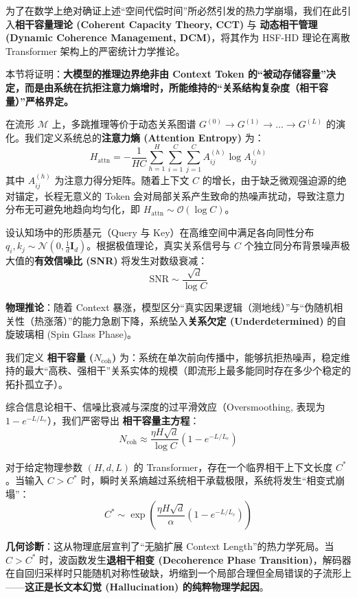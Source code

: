 为了在数学上绝对确证上述“空间代偿时间”所必然引发的热力学崩塌，我们在此引入\textbf{相干容量理论 (Coherent Capacity Theory, CCT)} 与 \textbf{动态相干管理 (Dynamic Coherence Management, DCM)}，将其作为 HSF-HD 理论在离散 Transformer 架构上的严密统计力学推论。

本节将证明：\textbf{大模型的推理边界绝非由 Context Token 的“被动存储容量”决定，而是由系统在抗拒注意力熵增时，所能维持的“关系结构复杂度（相干容量）”严格界定。}


在流形 $\mathcal{M}$ 上，多跳推理等价于动态关系图谱 $G^{(0)} \to G^{(1)} \to \dots \to G^{(L)}$ 的演化。我们定义系统总的\textbf{注意力熵 (Attention Entropy)} 为：
\begin{equation}
    H_{\text{attn}} = - \frac{1}{HC} \sum_{h=1}^H \sum_{i=1}^C \sum_{j=1}^C A_{ij}^{(h)} \log A_{ij}^{(h)}
\end{equation}
其中 $A_{ij}^{(h)}$ 为注意力得分矩阵。随着上下文 $C$ 的增长，由于缺乏微观强迫源的绝对锚定，长程无意义的 Token 会对局部关系产生致命的热噪声扰动，导致注意力分布无可避免地趋向均匀化，即 $H_{\text{attn}} \sim \mathcal{O}(\log C)$。

\begin{theorem}[极值信噪比衰减定理]
    设认知场中的形质基元（Query 与 Key）在高维空间中满足各向同性分布 $q_i, k_j \sim \mathcal{N}(0, \frac{1}{d}\mathbf{I}_d)$。根据极值理论，真实关系信号与 $C$ 个独立同分布背景噪声极大值的\textbf{有效信噪比 (SNR)} 将发生对数级衰减：
    $$ \text{SNR} \sim \frac{\sqrt{d}}{\log C} $$
\end{theorem}
\textbf{物理推论}：随着 Context 暴涨，模型区分“真实因果逻辑（测地线）”与“伪随机相关性（热涨落）”的能力急剧下降，系统坠入\textbf{关系欠定 (Underdetermined)} 的自旋玻璃相 (Spin Glass Phase)。


我们定义 \textbf{相干容量 ($N_{\text{coh}}$)} 为：系统在单次前向传播中，能够抗拒热噪声，稳定维持的最大“高秩、强相干”关系实体的规模（即流形上最多能同时存在多少个稳定的拓扑孤立子）。

综合信息论相干、信噪比衰减与深度的过平滑效应（Oversmoothing, 表现为 $1 - e^{-L/L_c}$），我们严密导出 \textbf{相干容量主方程}：
\begin{equation}
    \boxed{ N_{\text{coh}} \approx \frac{\eta H \sqrt{d}}{\log C} \left(1 - e^{-L/L_c}\right) }
\end{equation}

\begin{corollary}[长上下文相干退化定理]
    对于给定物理参数 $(H, d, L)$ 的 Transformer，存在一个临界相干上下文长度 $C^*$。当输入 $C > C^*$ 时，瞬时关系熵越过系统相干承载极限，系统将发生“相变式崩塌”：
    $$ C^* \sim \exp\left(\frac{\eta H \sqrt{d}}{\alpha} (1 - e^{-L/L_c})\right) $$
\end{corollary}
\textbf{几何诊断}：这从物理底层宣判了“无脑扩展 Context Length”的热力学死局。当 $C > C^*$ 时，波函数发生\textbf{退相干相变 (Decoherence Phase Transition)}，解码器在自回归采样时只能随机对称性破缺，坍缩到一个局部合理但全局错误的子流形上——\textbf{这正是长文本幻觉 (Hallucination) 的纯粹物理学起因}。

